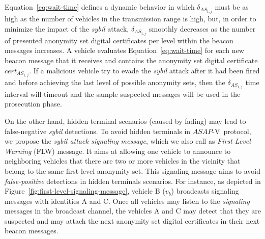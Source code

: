 \documentclass[preprint,12pt]{elsarticle}
\newcommand{\protocolname}{$ASAP$-V}
\begin{document}
Equation~\ref{eq:wait-time} defines a dynamic behavior in which $\delta_{AS_{1,j}}$ must be as high as the number of vehicles in the transmission range is high, but, in order to minimize the impact of the \textit{sybil} attack, $\delta_{AS_{1,j}}$ smoothly decreases as the number of presented anonymity set digital certificates per level within the beacon messages increases. A vehicle evaluates Equation~\ref{eq:wait-time} for each new beacon message that it receives and contains the anonymity set digital certificate $cert_{AS_{1, j}}$. If a malicious vehicle try to evade the \textit{sybil} attack after it had been fired and before achieving the last level of possible anonymity sets, then the $\delta_{AS_{1,j}}$ time interval will timeout and the sample suspected messages will be used in the prosecution phase.




On the other hand, hidden terminal scenarios (caused by fading) may lead to false-negative \textit{sybil} detections. To avoid hidden terminals in \protocolname~protocol, we propose the \textit{sybil attack signaling message}, which we also call as \textit{First Level Warning} (FLW) message. It aims at allowing one vehicle to announce to neighboring vehicles that there are two or more vehicles in the vicinity that belong to the same first level anonymity set. This signaling message aims to avoid \textit{false-positive} detections in hidden terminals scenarios. For instance, as depicted in Figure~\ref{fig:first-level-signaling-message}, vehicle B ($v_b$) broadcasts signaling messages with identities A and C. Once all vehicles may listen to the \textit{signaling} messages in the broadcast channel, the vehicles A and C may detect that they are suspected and may attach the next anonymity set digital certificates in their next beacon messages.
\end{document}
